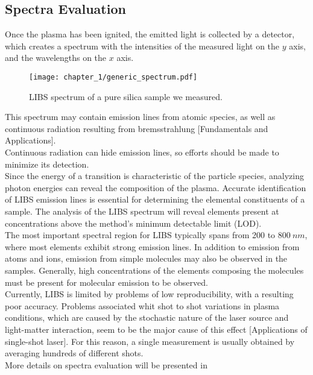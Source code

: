 \subsection{Spectra Evaluation}
\label{subsec:spectra_evaluation}
Once the plasma has been ignited, the emitted light is collected by a detector, which creates a spectrum with the intensities of the measured light on the $y$ axis, and the wavelengths on the $x$ axis. 
\begin{figure}[H]
    \centering
    \texttt{[image: chapter\_1/generic\_spectrum.pdf]}
    \vspace*{-30pt}
    \caption{LIBS spectrum of a pure silica sample we measured.}
    \label{fig:generic_spectrum}
\end{figure}
This spectrum may contain emission lines from atomic species, as well as continuous radiation resulting from bremsstrahlung [Fundamentals and Applications].
\\
Continuous radiation can hide emission lines, so efforts should be made to minimize its detection. 
\\
Since the energy of a transition is characteristic of the particle species, analyzing photon energies can reveal the composition of the plasma.
Accurate identification of LIBS emission lines is essential for determining the elemental constituents of a sample. The analysis of the LIBS spectrum will reveal elements present at concentrations above the method's minimum detectable limit (LOD).
\\
The most important spectral region for LIBS typically spans from 200 to $800\: nm$, where most elements exhibit strong emission lines. In addition to emission from atoms and ions, emission from simple molecules may also be observed in the samples. Generally, high concentrations of the elements composing the molecules must be present for molecular emission to be observed.
\\
Currently, LIBS is limited by problems of low reproducibility, with a resulting poor accuracy. Problems associated whit shot to shot variations in plasma conditions, which are caused by the stochastic nature of the laser source and light-matter interaction, seem to be the major cause of this effect [Applications of single-shot laser]. For this reason, a single measurement is usually obtained by averaging hundreds of different shots.
\\
More details on spectra evaluation will be presented in %